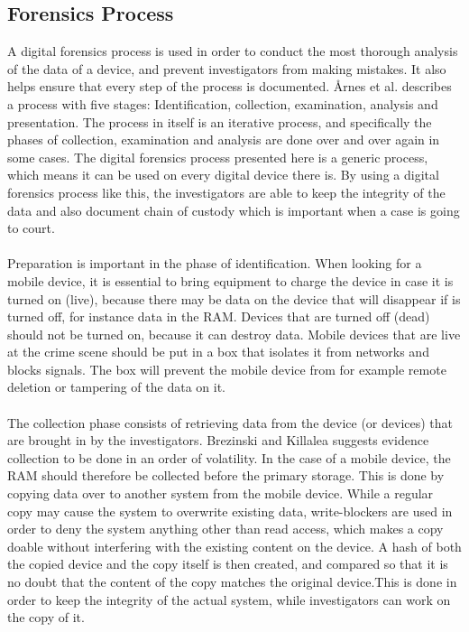 \subsection{Forensics Process}
A digital forensics process is used in order to conduct the most thorough analysis of the data of a device, and prevent investigators from making mistakes. It also helps ensure that every step of the process is documented. \r{A}rnes et al. describes a process with five stages: Identification, collection, examination, analysis and presentation\cite{DiFoBook}. The process in itself is an iterative process, and specifically the phases of collection, examination and analysis are done over and over again in some cases. The digital forensics process presented here is a generic process, which means it can be used on every digital device there is. By using a digital forensics process like this, the investigators are able to keep the integrity of the data and also document chain of custody which is important when a case is going to court.\\
\\
Preparation is important in the phase of identification. When looking for a mobile device, it is essential to bring equipment to charge the device in case it is turned on (live), because there may be data on the device that will disappear if is turned off, for instance data in the RAM. Devices that are turned off (dead) should not be turned on, because it can destroy data. Mobile devices that are live at the crime scene should be put in a box that isolates it from networks and blocks signals. The box will prevent the mobile device from for example remote deletion or tampering of the data on it\cite{DiFoBook}.\\
\\
The collection phase consists of retrieving data from the device (or devices) that are brought in by the investigators\cite{DiFoBook}. Brezinski and Killalea\cite{RFC3227} suggests evidence collection to be done in an order of volatility. In the case of a mobile device, the RAM should therefore be collected before the primary storage. This is done by copying data over to another system from the mobile device. While a regular copy may cause the system to overwrite existing data, write-blockers are used in order to deny the system anything other than read access, which makes a copy doable without interfering with the existing content on the device. A hash of both the copied device and the copy itself is then created, and compared so that it is no doubt that the content of the copy matches the original device\cite{DiFoBook}.This is done in order to keep the integrity of the actual system, while investigators can work on the copy of it.\\
